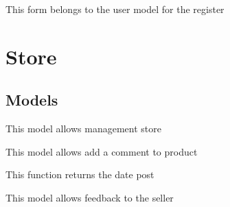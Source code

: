 \documentclass[letterpaper,10pt,english]{sphinxmanual}
\begin{document}

\begin{fulllineitems}
\label{modules/account:apps.account.forms.UserRegisterForm}
This form belongs to the user model for the register

\end{fulllineitems}



\section{Store}
\label{modules/store::doc}\label{modules/store:store}

\subsection{Models}
\label{modules/store:models}
This model allows management store
\label{modules/store:module-apps.store.models}

\begin{fulllineitems}
\label{modules/store:apps.store.models.FeedbackProduct}
This model allows add a comment to product

\begin{fulllineitems}
\label{modules/store:apps.store.models.FeedbackProduct.date_post}
This function returns the date post

\end{fulllineitems}


\end{fulllineitems}


\begin{fulllineitems}
\label{modules/store:apps.store.models.FeedbackSeller}
This model allows feedback to the seller

\end{fulllineitems}
\end{document}
